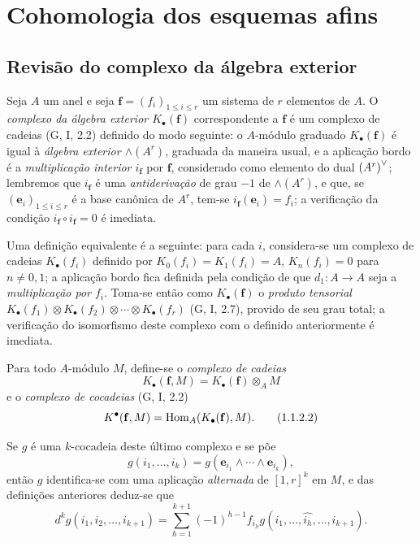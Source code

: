 \section{Cohomologia dos esquemas afins}
\label{section:III.1}

\subsection{Revisão do complexo da álgebra exterior}
\label{subsection:III.1.1}

\begin{env}[1.1.1]
\label{III.1.1.1}
Seja $A$ um anel e seja $\mathbf{f}=(f_i)_{1\leq i\leq r}$ um sistema de $r$ elementos de $A$.
O \emph{complexo da álgebra exterior $K_\bullet(\mathbf{f})$} correspondente a $\mathbf{f}$ é um complexo de cadeias (G, I, 2.2) definido do modo seguinte: o $A$-módulo graduado $K_\bullet(\mathbf{f})$ é igual à \emph{álgebra exterior $\wedge(A^r)$}, graduada da maneira usual, e a aplicação bordo é a \emph{multiplicação interior $i_\mathbf{f}$} por $\mathbf{f}$, considerado como elemento do dual ${(A^r)}^\vee$; lembremos que $i_\mathbf{f}$ é uma \emph{antiderivação} de grau $-1$ de $\wedge(A^r)$, e que, se $(\mathbf{e}_i)_{1\leq i\leq r}$ é a base canônica de $A^r$, tem-se $i_\mathbf{f}(\mathbf{e}_i)=f_i$; a verificação da condição $i_\mathbf{f}\circ i_\mathbf{f}=0$ é imediata.

Uma definição equivalente é a seguinte: para cada $i$, considera-se um complexo de cadeias $K_\bullet(f_i)$ definido por $K_0(f_i)=K_1(f_i)=A$, $K_n(f_i)=0$ para $n\neq 0,1$; a aplicação bordo fica definida pela condição de que $d_1:A\to A$ seja a \emph{multiplicação por $f_i$}.
Toma-se então como $K_\bullet(\mathbf{f})$ o \emph{produto tensorial $K_\bullet(f_1)\otimes K_\bullet(f_2)\otimes\cdots\otimes K_\bullet(f_r)$} (G, I, 2.7), provido de seu grau total; a verificação do isomorfismo deste complexo com o definido anteriormente é imediata.
\end{env}

\begin{env}[1.1.2]
\label{III.1.1.2}
Para todo $A$-módulo $M$, define-se o \emph{complexo de cadeias}
\[
\label{III.1.1.2.1}
  K_\bullet(\mathbf{f},M)=K_\bullet(\mathbf{f})\otimes_A M
  \tag{1.1.2.1}
\]
e o \emph{complexo de cocadeias} (G, I, 2.2)
\[
\label{III.1.1.2.2}
  K^\bullet(\mathbf{f},M)=\Hom_A(K_\bullet(\mathbf{f}),M).
  \tag{1.1.2.2}
\]

Se $g$ é uma $k$-cocadeia deste último complexo e se põe
\[
  g(i_1,\dots,i_k)=g(\mathbf{e}_{i_1}\wedge\cdots\wedge\mathbf{e}_{i_k}),
\]
então $g$ identifica-se com uma aplicação \emph{alternada} de $[1,r]^k$ em $M$, e das definições anteriores deduz-se que
\[
\label{III.1.1.2.3}
  d^k g(i_1,i_2,\dots,i_{k+1})=\sum_{h=1}^{k+1}(-1)^{h-1}f_{i_h}g(i_1,\dots,\widehat{i_h},\dots,i_{k+1}).
  \tag{1.1.2.3}
\]
\end{env}

